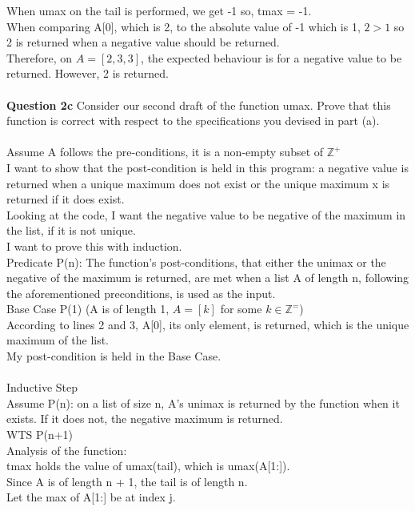 \documentclass[12pt]{article}
\begin{document}
When umax on the tail is performed, we get -1 so, tmax = -1.\\
When comparing A[0], which is 2, to the absolute value of -1 which is 1, $2>1$ so 2 is returned when a negative value should be returned.\\
Therefore, on $A = [2,3,3]$, the expected behaviour is for a negative value to be returned. However, 2 is returned.
\\
\\
\noindent\textbf{Question 2c} Consider our second draft of the function umax. Prove that this function is correct with respect to the specifications you devised in part (a).
\\
\\
Assume A follows the pre-conditions, it is a non-empty subset of $\mathbb{Z}^+$\\
I want to show that the post-condition is held in this program: a negative value is returned when a unique maximum does not exist or the unique maximum x is returned if it does exist.\\
Looking at the code, I want the negative value to be negative of the maximum in the list, if it is not unique.\\
I want to prove this with induction.\\
Predicate P(n): The function's post-conditions, that either the unimax or the negative of the maximum is returned, are met when a list A of length n, following the aforementioned preconditions, is used as the input.\\
Base Case P(1) (A is of length 1, $A = [k]$ for some $k \in \mathbb{Z}^=$)\\
According to lines 2 and 3, A[0], its only element, is returned, which is the unique maximum of the list.\\
My post-condition is held in the Base Case.\\
\\
Inductive Step\\
Assume P(n): on a list of size n, A's unimax is returned by the function when it exists. If it does not, the negative maximum is returned.\\
WTS P(n+1)\\
Analysis of the function:\\
tmax holds the value of umax(tail), which is umax(A[1:]).\\
Since A is of length n + 1, the tail is of length n.\\
Let the max of A[1:] be at index j.\\
\end{document}
